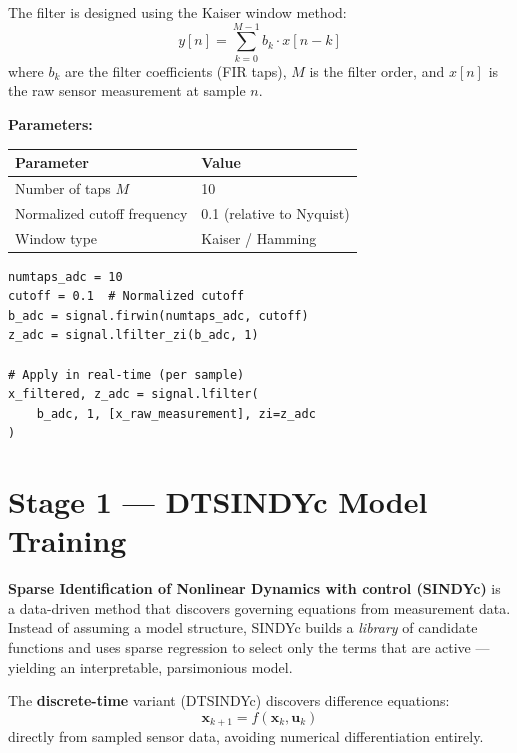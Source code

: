 \documentclass[11pt,a4paper]{article}
\begin{document}
\begin{equationbox}
The filter is designed using the Kaiser window method:
\begin{equation}
    y[n] = \sum_{k=0}^{M-1} b_k \cdot x[n-k]
    \label{eq:fir}
\end{equation}
where $b_k$ are the filter coefficients (FIR taps), $M$ is the filter order, and
$x[n]$ is the raw sensor measurement at sample $n$.

\textbf{Parameters:}
\begin{center}
\begin{tabular}{ll}
\toprule
\textbf{Parameter} & \textbf{Value} \\
\midrule
Number of taps $M$ & 10 \\
Normalized cutoff frequency & 0.1 (relative to Nyquist) \\
Window type & Kaiser / Hamming \\
\bottomrule
\end{tabular}
\end{center}
\end{equationbox}

\begin{codebox}
\begin{lstlisting}
numtaps_adc = 10
cutoff = 0.1  # Normalized cutoff
b_adc = signal.firwin(numtaps_adc, cutoff)
z_adc = signal.lfilter_zi(b_adc, 1)

# Apply in real-time (per sample)
x_filtered, z_adc = signal.lfilter(
    b_adc, 1, [x_raw_measurement], zi=z_adc
)
\end{lstlisting}
\end{codebox}

\section{Stage 1 --- DTSINDYc Model Training}
\label{sec:sindy}

\begin{conceptbox}
\textbf{Sparse Identification of Nonlinear Dynamics with control (SINDYc)} is a
data-driven method that discovers governing equations from measurement data.
Instead of assuming a model structure, SINDYc builds a \emph{library} of
candidate functions and uses sparse regression to select only the terms that
are active --- yielding an interpretable, parsimonious model.

The \textbf{discrete-time} variant (DTSINDYc) discovers difference equations:
\[
    \mathbf{x}_{k+1} = f(\mathbf{x}_k, \mathbf{u}_k)
\]
directly from sampled sensor data, avoiding numerical differentiation entirely.
\end{conceptbox}
\end{document}
